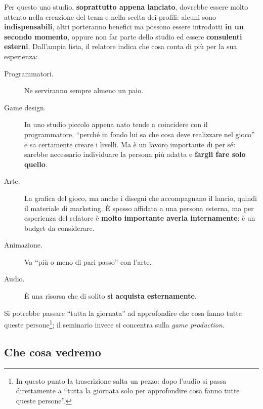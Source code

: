 Per questo uno studio, \textbf{soprattutto appena lanciato}, dovrebbe essere
molto attento nella creazione del team e nella scelta dei profili: alcuni sono
\textbf{indispensabili}, altri porteranno benefici ma possono essere introdotti
\textbf{in un secondo momento}, oppure non far parte dello studio ed essere
\textbf{consulenti esterni}. Dall'ampia lista, il relatore indica che cosa
conta di più per la sua esperienza:
\begin{description}
  \item[Programmatori.] Ne serviranno sempre almeno un paio.
  \item[Game design.] In uno studio piccolo appena nato tende a coincidere con
        il programmatore, ``perché in fondo lui sa che cosa deve realizzare nel
        gioco'' e sa certamente creare i livelli. Ma è un lavoro importante di
        per sé: sarebbe necessario individuare la persona più adatta e
        \textbf{fargli fare solo quello}.
  \item[Arte.] La grafica del gioco, ma anche i disegni che accompagnano il
        lancio, quindi il materiale di marketing. È spesso affidata a una persona
        esterna, ma per esperienza del relatore è \textbf{molto importante
        averla internamente}: è un budget da considerare.
  \item[Animazione.] Va ``più o meno di pari passo'' con l'arte.
  \item[Audio.] È una risorsa che di solito \textbf{si acquista esternamente}.
\end{description}
Si potrebbe passare ``tutta la giornata'' ad approfondire che cosa fanno tutte
queste persone\footnote{In questo punto la trascrizione salta un pezzo: dopo
l'audio si passa direttamente a ``tutta la giornata solo per approfondire cosa
fanno tutte queste persone''.}; il seminario invece si concentra sulla
\emph{game production}.

\subsection{Che cosa vedremo}

